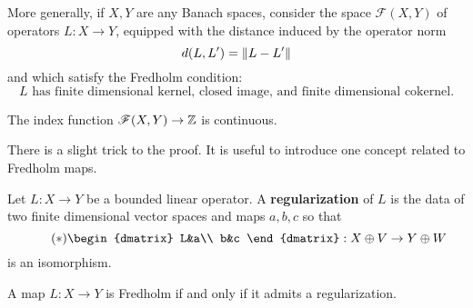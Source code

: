 \documentclass{amsart}
\begin{document}
 More generally, if $X,Y$ are any Banach spaces, consider the space
 $\mathscr{F}(X,Y)$ of operators $L:X\to Y$, equipped with the distance
 induced by the operator norm
 \begin{equation*}
   d(L,L')=\left\lVert L-L'\right\rVert
 \end{equation*}
 and which satisfy the Fredholm condition:
 \begin{equation*}
   L\text{ has finite dimensional kernel, closed image, and finite dimensional cokernel}.
 \end{equation*}
 \begin{thm}
   The index function $\mathscr{F}(X,Y)\to \mathbb{Z}$ is continuous. 
 \end{thm}
 There is a slight trick to the proof. It is useful to introduce one
 concept related to Fredholm maps.
 \begin{defn}
   Let $L:X\to Y$ be a bounded linear operator. A
   \textbf{regularization} of $L$ is the data of two finite
   dimensional vector spaces and maps $a,b,c$ so that
   \begin{equation*}\tag{$\ast$}
    \begin{dmatrix}
       L&a\\
       b&c
     \end{dmatrix}:X\oplus V\to Y\oplus W
   \end{equation*}
   is an isomorphism.
 \end{defn}
 \begin{prop}
   A map $L:X\to Y$ is Fredholm if and only if it admits a regularization.
 \end{prop}
\end{document}
